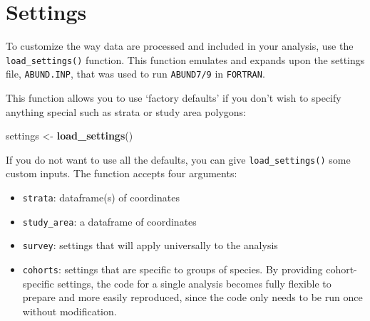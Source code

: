 \documentclass[
]{book}
\newenvironment{Shaded}{\begin{snugshade}}{\end{snugshade}}
\newcommand{\CommentTok}[1]{\textcolor[rgb]{0.56,0.35,0.01}{\textit{#1}}}
\newcommand{\ControlFlowTok}[1]{\textcolor[rgb]{0.13,0.29,0.53}{\textbf{#1}}}
\newcommand{\KeywordTok}[1]{\textcolor[rgb]{0.13,0.29,0.53}{\textbf{#1}}}
\newcommand{\NormalTok}[1]{#1}
\newcommand{\OperatorTok}[1]{\textcolor[rgb]{0.81,0.36,0.00}{\textbf{#1}}}
\newcommand{\StringTok}[1]{\textcolor[rgb]{0.31,0.60,0.02}{#1}}
\begin{document}
\begin{Shaded}
\end{Shaded}

\hypertarget{settings}{%
\chapter{Settings}\label{settings}}

To customize the way data are processed and included in your analysis, use the \texttt{load\_settings()} function. This function emulates and expands upon the settings file, \texttt{ABUND.INP}, that was used to run \texttt{ABUND7/9} in \texttt{FORTRAN}.

This function allows you to use `factory defaults' if you don't wish to specify anything special such as strata or study area polygons:

\begin{Shaded}
\begin{Highlighting}[]
\NormalTok{settings <-}\StringTok{ }\KeywordTok{load_settings}\NormalTok{()}
\end{Highlighting}
\end{Shaded}

If you do not want to use all the defaults, you can give \texttt{load\_settings()} some custom inputs. The function accepts four arguments:

\begin{itemize}
\item
  \texttt{strata}: dataframe(s) of coordinates
\item
  \texttt{study\_area}: a dataframe of coordinates
\item
  \texttt{survey}: settings that will apply universally to the analysis
\item
  \texttt{cohorts}: settings that are specific to groups of species. By providing cohort-specific settings, the code for a single analysis becomes fully flexible to prepare and more easily reproduced, since the code only needs to be run once without modification.
\end{itemize}
\end{document}
